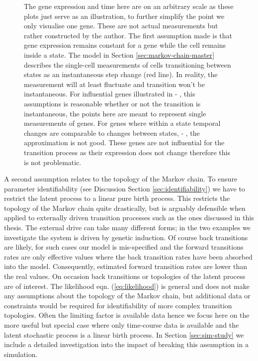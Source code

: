 \begin{figure}
{    The gene expression and time here are on an arbitrary scale as these plots just serve as an illustration, to further simplify the point we only visualise one gene. These are not actual measurements but rather constructed by the author. The first assumption made is that gene expression remains constant for a gene while the cell remains inside a state. The model in Section \ref{sec:markov-chain-master} describes the single-cell measurements of cells transitioning between states as an instantaneous step change (red line). In reality, the measurement will at least fluctuate and transition won't be instantaneous. For influential genes illustrated in  - , this assumptions is reasonable whether or not the transition is instantaneous, the points here are meant to represent single measurements of genes. For genes where within a state temporal changes are comparable to changes between states,  - , the approximation is not good. These genes are not influential for the transition process as their expression does not change therefore this is not problematic.
 }
  \label{fig:schematic-ass1}
\end{figure}

A second assumption relates to the topology of the Markov chain. To ensure parameter identifiability (see Discussion Section \ref{sec:identifiability}) we have to restrict the latent process to a linear pure birth process. This restricts the topology of the Markov chain quite drastically, but is arguably defensible when applied to externally driven transition processes such as the ones discussed in this thesis. The external drive can take many different forms; in the two examples we investigate the system is driven by genetic induction. Of course back transitions are likely, for such cases our model is mis-specified and the forward transitions rates are only effective values where the back transition rates have been absorbed into the model. Consequently, estimated forward transition rates are lower than the real values. On occasion back transitions or topologies of the latent process are of interest.
The likelihood eqn. (\ref{eq:likelihood}) is general and does not make any assumptions about the topology of the Markov chain, but additional data or constraints would be required for identifiability of more complex transition topologies. Often the limiting factor is available data hence we focus here on the more useful but special case where only time-course data is available and the latent stochastic process is a linear birth process. In Section \ref{sec:sim-study} we include a detailed investigation into the impact of breaking this assumption in a simulation.

